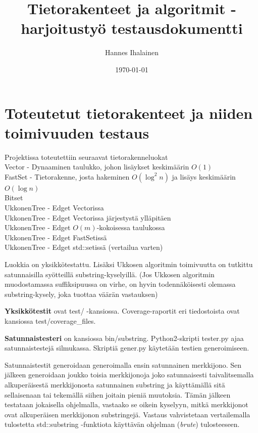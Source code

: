 \documentclass{article}
\title{Tietorakenteet ja algoritmit -harjoitustyö testausdokumentti}
\author{Hannes Ihalainen}
\date{\today}
\begin{document}
    \maketitle
    \newpage
    \tableofcontents
    \newpage
    \section{Toteutetut tietorakenteet ja niiden toimivuuden testaus}
        Projektissa toteutettiin seuraavat tietorakenneluokat \\
        Vector - Dynaaminen taulukko, johon lisäykset keskimäärin $O(1)$\\
        FastSet - Tietorakenne, josta hakeminen $O(\log^2 n)$ ja lisäys keskimäärin $O(\log n)$\\
        Bitset \\
        UkkonenTree - Edget Vectorissa \\
        UkkonenTree - Edget Vectorissa järjestystä ylläpitäen \\
        UkkonenTree - Edget $O(m)$-kokoisessa taulukossa \\
        UkkonenTree - Edget FastSetissä \\
        UkkonenTree - Edget std::setissä (vertailua varten) 

        Luokkia on yksikkötestattu. Lisäksi Ukkosen algoritmin toimivuutta on tutkittu satunnaisilla syötteillä
        substring-kyselyillä. (Jos Ukkosen algoritmin muodostamassa suffiksipuussa on virhe, on hyvin todennäköisesti
        olemassa substring-kysely, joka tuottaa väärän vastauksen)

        \textbf{Yksikkötestit} ovat test/ -kansiossa. Coverage-raportit eri tiedostoista ovat kansiossa test/coverage\_files.

        \textbf{Satunnaistesteri} on kansiossa bin/substring. Python2-skripti tester.py ajaa satunnaistestejä silmukassa. 
        Skriptiä gener.py käytetään testien generoimiseen.

        Satunnaistestit generoidaan generoimalla ensin satunnainen merkkijono. Sen jälkeen generoidaan joukko toisia 
        merkkijonoja joko satunnaisesti taivalitsemalla alkuperäisestä merkkijonosta satunnainen substring ja käyttämällä
        sitä sellaisenaan tai tekemällä siihen joitain pieniä muutoksia. Tämän jälkeen testataan jokaisella ohjelmalla,
        vastaako se oikein kyselyyn, mitkä merkkijonot ovat alkuperäisen merkkijonon substringejä. Vastaus vahvistetaan 
        vertailemalla tulostetta std::substring -funktiota käyttävän ohjelman (\textit{brute}) tulosteeseen.
\end{document}
